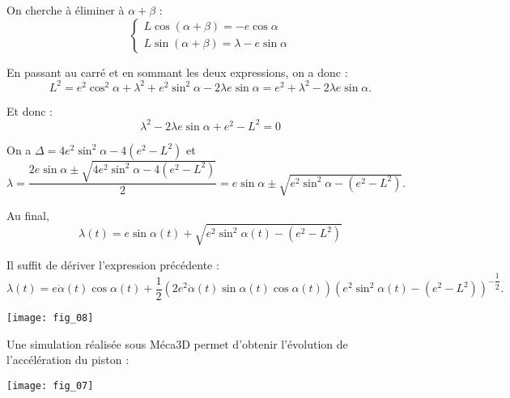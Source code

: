 \begin{corrige}
On cherche à éliminer à $\alpha+\beta$ :
$$
\left\{
\begin{array}{l}
L\cos\left(\alpha+\beta\right)  = - e\cos\alpha \\
L \sin\left(\alpha+\beta\right) =  \lambda - e\sin\alpha
\end{array}
\right.
$$

En passant au carré et en sommant les deux expressions, on a donc : 
$$
L^2=e^2\cos^2\alpha + \lambda^2 + e^2\sin^2\alpha-2\lambda e \sin\alpha
=e^2+ \lambda^2 -2\lambda e \sin\alpha.
$$

Et donc :
$$
 \lambda^2 -2\lambda e \sin\alpha+e^2-L^2=0
$$


On a $\Delta = 4e^2\sin^2\alpha - 4\left(e^2 - L^2 \right)$ et 
$\lambda 
= \dfrac{2 e \sin\alpha\pm \sqrt{4e^2\sin^2\alpha - 4\left(e^2 - L^2 \right)}}{2}
=  e \sin\alpha\pm \sqrt{e^2\sin^2\alpha - \left(e^2 - L^2 \right)}$.

Au final, 
$$\lambda(t)=  e \sin\alpha(t)+ \sqrt{e^2\sin^2\alpha(t) - \left(e^2 - L^2 \right)}$$



\end{corrige}
\else
\fi
{}
\ifprof
\begin{corrige}
Il suffit de dériver l'expression précédente :
$$\lambda(t)=  e \dot{\alpha}(t)\cos\alpha(t)+ \dfrac{1}{2}\left(2e^2\dot{\alpha}(t)\sin\alpha(t)\cos\alpha(t) \right)\left(e^2\sin^2\alpha(t) - \left(e^2 - L^2 \right)\right)^{-\dfrac{1}{2}}.$$
\end{corrige}
\else
\fi

\ifprof
\begin{corrige}
\begin{center}
\texttt{[image: fig\_08]}
\end{center}
\end{corrige}
\else
\fi


Une simulation réalisée sous Méca3D permet d'obtenir l'évolution de l'accélération du piston : 

\begin{center}
\texttt{[image: fig\_07]}
\end{center}



